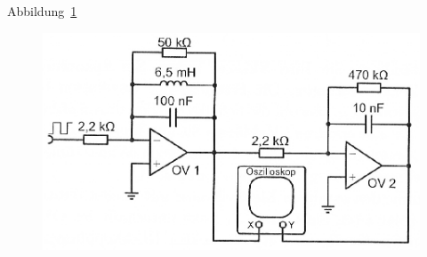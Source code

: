 Abbildung~\ref{fig:5-2}

\begin{figure}[htbp]
	\centering
	\includegraphics[width=.6\linewidth]{Anleitung/5-2.png}
	\caption{%
		\cite[Abbildung~5.2]{physik313-Anleitung}
	}
	\label{fig:5-2}
\end{figure}


\FloatBarrier
\IfFileExists{\bibliographyfile}{
	
}{}



